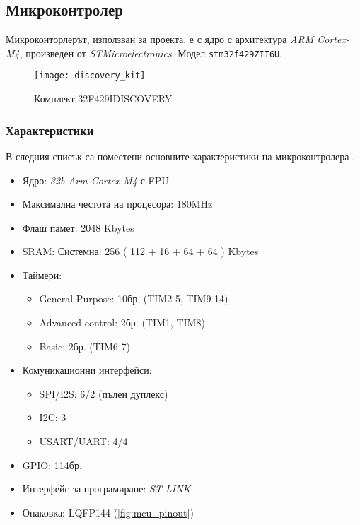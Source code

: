 \subsection{Микроконтролер}
\FloatBarrier

Микроконторлерът, използван за проекта, е с ядро с архитектура \textit{ARM Cortex-M4},
произведен от \textit{STMicroelectronics}.
Модел \texttt{stm32f429ZIT6U}.

\begin{figure}[htpb!]
    \centering
    \texttt{[image: discovery\_kit]}
    \caption{Комплект 32F429IDISCOVERY}
    \label{fig:discovery_kit}
\end{figure}

\subsubsection{Характеристики}

В следния списък са поместени основните характеристики
на микроконтролера \cite{stmmcudatasheet}.

\begin{itemize} 
    \item Ядро: \textit{32b Arm Cortex-M4} с FPU
    \item Максимална честота на процесора: 180MHz
    \item Флаш памет: 2048 Kbytes
    \item SRAM: Системна: 256 ( 112 + 16 + 64 + 64 ) Kbytes
    \item Таймери:
    \begin{itemize} 
        \item General Purpose: 10бр. (TIM2-5, TIM9-14)
        \item Advanced control: 2бр. (TIM1, TIM8)
        \item Basic: 2бр. (TIM6-7)
    \end{itemize}     
    \item Комуникационни интерфейси:
    \begin{itemize}
        \item SPI/I2S: 6/2 (пълен дуплекс) 
        \item I2C: 3
        \item USART/UART: 4/4
    \end{itemize} 
    \item GPIO: 114бр.
    \item Интерфейс за програмиране: \textit{ST-LINK}
    \item Опаковка: LQFP144 (\autoref{fig:mcu_pinout})
\end{itemize}



